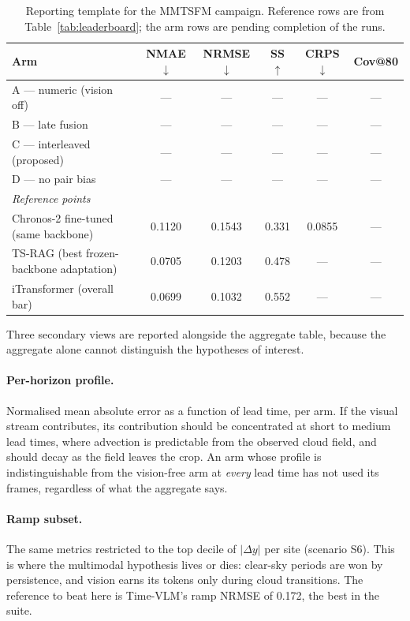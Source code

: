\begin{table}[h!]
\centering
\small
\begin{tabular}{l c c c c c}
\hline
\textbf{Arm} & \textbf{NMAE} $\downarrow$ & \textbf{NRMSE} $\downarrow$ &
\textbf{SS} $\uparrow$ & \textbf{CRPS} $\downarrow$ & \textbf{Cov@80} \\
\hline
A --- numeric (vision off) & --- & --- & --- & --- & --- \\
B --- late fusion & --- & --- & --- & --- & --- \\
C --- interleaved (proposed) & --- & --- & --- & --- & --- \\
D --- no pair bias & --- & --- & --- & --- & --- \\
\hline
\multicolumn{6}{l}{\emph{Reference points}} \\
Chronos-2 fine-tuned (same backbone) & 0.1120 & 0.1543 & 0.331 & 0.0855 & --- \\
TS-RAG (best frozen-backbone adaptation) & 0.0705 & 0.1203 & 0.478 & --- & --- \\
iTransformer (overall bar) & 0.0699 & 0.1032 & 0.552 & --- & --- \\
\hline
\end{tabular}
\caption{Reporting template for the MMTSFM campaign. Reference rows are from
Table~\ref{tab:leaderboard}; the arm rows are pending completion of the runs.}
\label{tab:mmtsfm-results}
\end{table}

Three secondary views are reported alongside the aggregate table, because the aggregate
alone cannot distinguish the hypotheses of interest.

\paragraph{Per-horizon profile.} Normalised mean absolute error as a function of lead time,
per arm. If the visual stream contributes, its contribution should be concentrated at short
to medium lead times, where advection is predictable from the observed cloud field, and
should decay as the field leaves the crop. An arm whose profile is indistinguishable from
the vision-free arm at \emph{every} lead time has not used its frames, regardless of what
the aggregate says.

\paragraph{Ramp subset.} The same metrics restricted to the top decile of $|\Delta y|$ per
site (scenario S6). This is where the multimodal hypothesis lives or dies: clear-sky periods
are won by persistence, and vision earns its tokens only during cloud transitions. The
reference to beat here is Time-VLM's ramp NRMSE of 0.172, the best in the suite.

